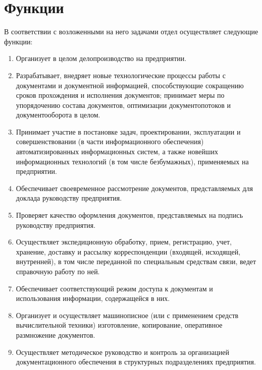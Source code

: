 \documentclass[a4paper,12pt]{article}
\begin{document}
\section{Функции}

В соответствии с возложенными на него задачами отдел осуществляет следующие функции:

\begin{enumerate}
	\item Организует в целом делопроизводство на предприятии.
	
	\item Разрабатывает, внедряет новые технологические процессы работы с документами и документной информацией, способствующие сокращению сроков прохождения и исполнения документов; принимает меры по упорядочению состава документов, оптимизации документопотоков и документооборота в целом.
	
	\item Принимает участие в постановке задач, проектировании, эксплуатации и совершенствовании (в части информационного обеспечения) автоматизированных информационных систем, а также новейших информационных технологий (в том числе безбумажных), применяемых на предприятии.
	
	\item Обеспечивает своевременное рассмотрение документов, представляемых для доклада руководству предприятия.
	
	\item Проверяет качество оформления документов, представляемых на подпись руководству предприятия.
	
	\item Осуществляет экспедиционную обработку, прием, регистрацию, учет, хранение, доставку и рассылку корреспонденции (входящей, исходящей, внутренней), в том числе переданной по специальным средствам связи, ведет справочную работу по ней.
	
	\item Обеспечивает соответствующий режим доступа к документам и использования информации, содержащейся в них.
	
	\item Организует и осуществляет машинописное (или с применением средств вычислительной техники) изготовление, копирование, оперативное размножение документов.
	
	\item Осуществляет методическое руководство и контроль за организацией документационного обеспечения в структурных подразделениях предприятия.
	

\end{enumerate}
\end{document}
